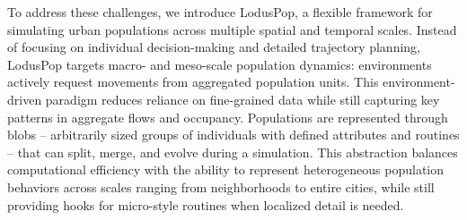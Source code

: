\documentclass[pdflatex,sn-mathphys-num]{sn-jnl}%
\newcommand\redb[1]{#1}
\theoremstyle{thmstyleone}%
\theoremstyle{thmstyletwo}%
\theoremstyle{thmstylethree}%
\begin{document}

To address these challenges, we introduce LodusPop, a flexible framework for simulating urban populations across multiple spatial and temporal scales. \redb{Instead of focusing on individual decision-making and detailed trajectory planning, LodusPop targets macro- and meso-scale population dynamics: environments actively request movements from aggregated population units.} This environment-driven paradigm reduces reliance on fine-grained data while still capturing key patterns in aggregate flows and occupancy. Populations are represented through blobs -- arbitrarily sized groups of individuals with defined attributes and routines -- that can split, merge, and evolve during a simulation. This abstraction balances computational efficiency with the ability to represent heterogeneous population behaviors across scales ranging from neighborhoods to entire cities, while still providing hooks for micro-style routines when localized detail is needed.

\end{document}

